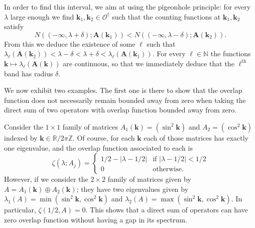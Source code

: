 \documentclass[AHL,Unicode,longabstracts,published]{cedram}
\newcommand{\R}{\mathbb R}
\newcommand{\N}{\mathbb N}
\newcommand{\Z}{\mathbb Z}
\newcommand{\CO}{\mathcal{O}}
\newcommand{\BA}{\mathbf A}
\newcommand{\bk}{\mathbf k}
\newcommand{\abs}[1]{\left\lvert #1 \right\rvert}
\begin{document}
In order to find this interval, we aim at using the pigeonhole principle: for every $\lambda$ large enough we find $\bk_1, \bk_2 \in \CO^\dagger$ such that the counting functions at $\bk_1,\bk_2$ satisfy
\begin{equation}\label{eq:characoverlap}
N((-\infty,\lambda + \delta);\BA(\bk_1)) < N((-\infty,\lambda - \delta);\BA(\bk_2)).
\end{equation}
From this we deduce the existence of some $\ell$ such that $\lambda_\ell(\BA(\bk_2)) < \lambda - \delta < \lambda + \delta <\lambda_\ell(\BA(\bk_1))$. For every $\ell \in \N$ the functions $\bk \mapsto
\lambda_\ell(\BA(\bk))$ are continuous, so that we immediately deduce that the $\ell^{\text{th}}$ band has radius $\delta$.

We now exhibit two examples. The first one is there to show that the overlap function does not necessarily remain bounded away from zero when taking the direct sum of two operators with overlap function bounded away from zero.
\begin{exem}\label{ex:overlapcrash}
Consider the $1 \times 1$ family of matrices $A_1(\bk) = (\sin^2 \bk)$ and $A_2 = (\cos^2 \bk)$ indexed by $\bk \in \R/2\pi\Z$. Of course, for each $\bk$ each of those matrices has exactly one eigenvalue, and the overlap function associated to each is
\begin{equation}
\zeta(\lambda;A_j) =
\begin{cases}
1/2 - \abs{\lambda - 1/2}& \text{if } \abs{\lambda - 1/2} < 1/2 \\
0 & \text{otherwise.}
\end{cases}
\end{equation}
However, if we consider the $2 \times 2$ family of matrices given by $A = A_1(\bk)
\oplus A_2(\bk)$; they have two eigenvalues given by $\lambda_1(A) =
\min(\sin^2\bk,\cos^2 \bk)$ and $\lambda_2(A) =
\max(\sin^2 \bk,\cos^2 \bk)$. In particular, $\zeta(1/2,A) = 0$. This shows that a direct sum of operators can have zero overlap function without having a gap in its spectrum.
\end{exem}
\end{document}
